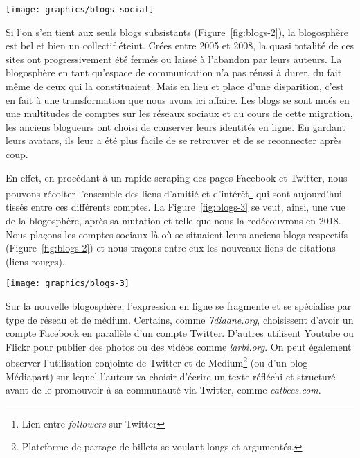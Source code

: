 \documentclass[symmetric,justified,marginals=raggedouter]{tufte-book}
\begin{document}
\newpage

\begin{figure*}
  \texttt{[image: graphics/blogs-social]}
  \caption{Liste des blogs de 2008 liés à des réseaux sociaux en 2018}
  \label{fig:blogs-social}
\end{figure*} 

\noindent Si l'on s'en tient aux seuls blogs subsistants (Figure~\ref{fig:blogs-2}), la blogosphère est bel et bien un collectif éteint. Crées entre 2005 et 2008, la quasi totalité de ces sites ont progressivement été fermés ou laissé à l'abandon par leurs auteurs. La blogosphère en tant qu'espace de communication n'a pas réussi à durer, du fait même de ceux qui la constituaient. Mais en lieu et place d'une disparition, c'est en fait à une transformation que nous avons ici affaire. Les blogs se sont mués en une multitudes de comptes sur les réseaux sociaux et au cours de cette migration, les anciens blogueurs ont choisi de conserver leurs identités en ligne. En gardant leurs avatars, ils leur a été plus facile de se retrouver et de se reconnecter après coup.

En effet, en procédant à un rapide scraping des pages Facebook et Twitter, nous pouvons récolter l'ensemble des liens d'amitié et d'intérêt\footnote{\RaggedOuter Lien entre \textit{followers} sur Twitter} qui sont aujourd'hui tissés entre ces différents comptes. La Figure~\ref{fig:blogs-3} se veut, ainsi, une vue de la blogosphère, après sa mutation et telle que nous la redécouvrons en 2018. Nous plaçons les comptes sociaux là où se situaient leurs anciens blogs respectifs (Figure~\ref{fig:blogs-2}) et nous traçons entre eux les nouveaux liens de citations (liens rouges).

\newpage

\begin{figure*}
  \texttt{[image: graphics/blogs-3]}
  \caption{La blogosphère en 2018, les emplacements des blogs sont conservés}
  \label{fig:blogs-3}
\end{figure*} 

\noindent Sur la nouvelle blogosphère, l'expression en ligne se fragmente et se spécialise par type de réseau et de médium. Certains, comme \textit{7didane.org}, choisissent d'avoir un compte Facebook en parallèle d'un compte Twitter. D'autres utilisent Youtube ou Flickr pour publier des photos ou des vidéos comme \textit{larbi.org}. On peut également observer l'utilisation conjointe de Twitter et de Medium\footnote{\RaggedOuter Plateforme de partage de billets se voulant longs et argumentés.} (ou d'un blog Médiapart) sur lequel l'auteur va choisir d'écrire un texte réfléchi et structuré avant de le promouvoir à sa communauté via Twitter, comme \textit{eatbees.com}. 
\end{document}
